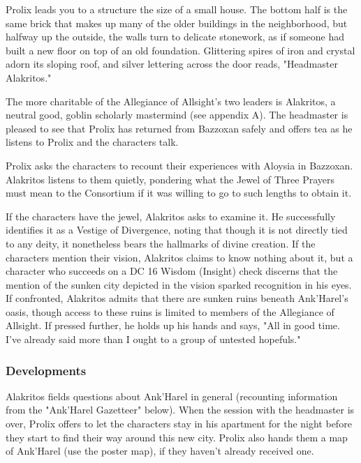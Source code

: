\documentclass[10pt,a4paper,twoside,twocolumn,openany,nodeprecatedcode]{dndbook}
\begin{document}
\begin{DndReadAloud}{}
Prolix leads you to a structure the size of a small house. The bottom half is the same brick that makes up many of the older buildings in the neighborhood, but halfway up the outside, the walls turn to delicate stonework, as if someone had built a new floor on top of an old foundation. Glittering spires of iron and crystal adorn its sloping roof, and silver lettering across the door reads, "Headmaster Alakritos."

\end{DndReadAloud}

The more charitable of the Allegiance of Allsight's two leaders is Alakritos, a neutral good, goblin scholarly mastermind (see appendix A). The headmaster is pleased to see that Prolix has returned from Bazzoxan safely and offers tea as he listens to Prolix and the characters talk.

Prolix asks the characters to recount their experiences with Aloysia in Bazzoxan. Alakritos listens to them quietly, pondering what the Jewel of Three Prayers must mean to the Consortium if it was willing to go to such lengths to obtain it.

If the characters have the jewel, Alakritos asks to examine it. He successfully identifies it as a Vestige of Divergence, noting that though it is not directly tied to any deity, it nonetheless bears the hallmarks of divine creation. If the characters mention their vision, Alakritos claims to know nothing about it, but a character who succeeds on a DC 16 Wisdom (Insight) check discerns that the mention of the sunken city depicted in the vision sparked recognition in his eyes. If confronted, Alakritos admits that there are sunken ruins beneath Ank'Harel's oasis, though access to these ruins is limited to members of the Allegiance of Allsight. If pressed further, he holds up his hands and says, "All in good time. I've already said more than I ought to a group of untested hopefuls."

\subsubsection{Developments}
Alakritos fields questions about Ank'Harel in general (recounting information from the "Ank'Harel Gazetteer" below). When the session with the headmaster is over, Prolix offers to let the characters stay in his apartment for the night before they start to find their way around this new city. Prolix also hands them a map of Ank'Harel (use the poster map), if they haven't already received one.
\end{document}

